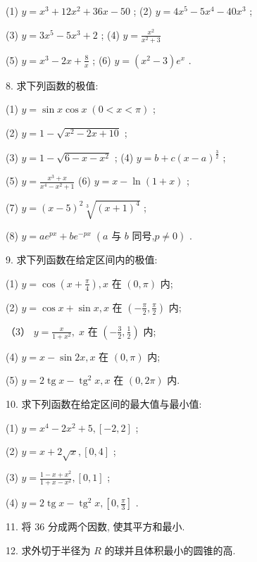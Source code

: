 \documentclass[10pt]{article}
\begin{document}
(1) \(y = {x}^{3} + {12}{x}^{2} + {36x} - {50}\) ; (2) \(y = 4{x}^{5} - 5{x}^{4} - {40}{x}^{3}\) ;

(3) \(y = 3{x}^{5} - 5{x}^{3} + 2\) ; (4) \(y = \frac{{x}^{2}}{{x}^{2} + 3}\)

(5) \(y = {x}^{3} - {2x} + \frac{8}{x}\) ; (6) \(y = \left( {{x}^{2} - 3}\right) {e}^{x}\) .

8. 求下列函数的极值:

(1) \(y = \sin x\cos x\;\left( {0 < x < \pi }\right)\) ;

(2) \(y = 1 - \sqrt{{x}^{2} - {2x} + {10}}\) ;

(3) \(y = 1 - \sqrt{6 - x - {x}^{2}}\) ; (4) \(y = b + c{\left( x - a\right) }^{\frac{3}{2}}\) ;

(5) \(y = \frac{{x}^{3} + x}{{x}^{4} - {x}^{2} + 1}\) (6) \(y = x - \ln \left( {1 + x}\right)\) ;

(7) \(y = {\left( x - 5\right) }^{2}\sqrt[3]{{\left( x + 1\right) }^{4}}\) ;

(8) \(y = a{e}^{px} + b{e}^{-{px}}\;\left( {a\text{ 与 }b\text{ 同号,}p \neq 0}\right)\) .

9. 求下列函数在给定区间内的极值:

(1) \(y = \cos \left( {x + \frac{\pi }{4}}\right) ,x\) 在 \(\left( {0,\pi }\right)\) 内;

(2) \(y = \cos x + \sin x,x\) 在 \(\left( {-\frac{\pi }{2},\frac{\pi }{2}}\right)\) 内;

（3） \(y = \frac{x}{1 + {x}^{2}},\;x\) 在 \(\left( {-\frac{3}{2},\frac{1}{2}}\right)\) 内;

(4) \(y = x - \sin {2x},x\) 在 \(\left( {0,\pi }\right)\) 内;

(5) \(y = 2\operatorname{tg}x - {\operatorname{tg}}^{2}x,x\) 在 \(\left( {0,{2\pi }}\right)\) 内.

10. 求下列函数在给定区间的最大值与最小值:

(1) \(y = {x}^{4} - 2{x}^{2} + 5,\left\lbrack {-2,2}\right\rbrack\) ;

(2) \(y = x + 2\sqrt{x},\left\lbrack {0,4}\right\rbrack\) ;

(3) \(y = \frac{1 - x + {x}^{2}}{1 + x - {x}^{2}},\left\lbrack {0,1}\right\rbrack\) ;

(4) \(y = 2\operatorname{tg}x - {\operatorname{tg}}^{2}x,\left\lbrack {0,\frac{\pi }{3}}\right\rbrack\) .

11. 将 36 分成两个因数, 使其平方和最小.

12. 求外切于半径为 \(R\) 的球并且体积最小的圆锥的高.
\end{document}
